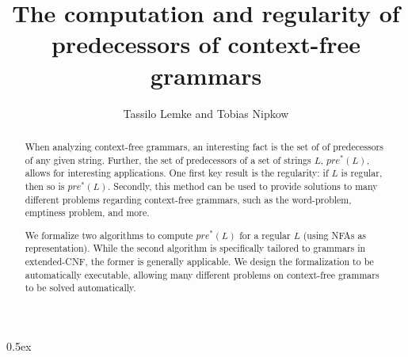 \documentclass[11pt,a4paper]{article}
\begin{document}
\title{The computation and regularity of predecessors of context-free grammars}
\author{Tassilo Lemke and Tobias Nipkow}
\maketitle

\begin{abstract}
  When analyzing context-free grammars, an interesting fact is the set of of predecessors of
  any given string. Further, the set of predecessors of a set of strings $L$, $pre^*(L)$, allows for
  interesting applications. One first key result is the regularity: if $L$ is regular, then so is
  $pre^*(L)$. Secondly, this method can be used to provide solutions to many different problems
  regarding context-free grammars, such as the word-problem, emptiness problem, and more.

  We formalize two algorithms to compute $pre^*(L)$ for a regular $L$ (using NFAs as representation).
  While the second algorithm is specifically tailored to grammars in extended-CNF, the former
  is generally applicable. We design the formalization to be automatically executable,
  allowing many different problems on context-free grammars to be solved automatically.
\end{abstract}

\newpage
\tableofcontents

\parindent 0pt\parskip 0.5ex

\newpage




\end{document}
